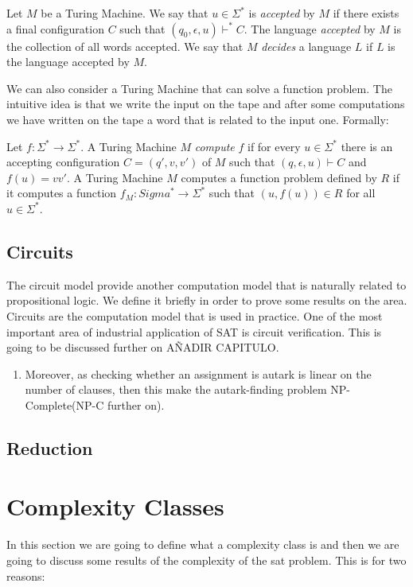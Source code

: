   \begin{definition}
     Let $M$ be a Turing Machine. We say that $u\in\Sigma^*$ is \emph{accepted} by $M$ if there exists a final configuration $C$ such that $(q_0,\epsilon,u)\vdash^* C$. The language \emph{accepted} by $M$ is the collection of all words accepted. We say that $M$ \emph{decides} a language $L$ if $L$ is the language accepted by $M$.
  \end{definition}

  We can also consider a Turing Machine that can solve a function problem. The intuitive idea is that we write the input on the tape and after some computations we have written on the tape a word that is related to the input one. Formally:


  \begin{definition}
    Let $f:\Sigma^*\to \Sigma^*$. A Turing Machine $M$ \emph{compute} $f$ if for every $u\in \Sigma^*$ there is an accepting configuration $C=(q',v,v')$ of $M$  such that $(q,\epsilon,u)\vdash C$ and $f(u)=vv'$. A Turing Machine $M$ computes a function problem defined by $R$ if it computes a function $f_M:Sigma^*\to \Sigma^*$ such that $(u,f(u)) \in R$ for all $ u\in \Sigma^*$.
  \end{definition}

  
\subsection{Circuits}

The circuit model provide another computation model that is naturally related to propositional logic. We define it briefly in order to prove some results on the area. Circuits are the computation model that is used in practice. One of the most important area of industrial application of SAT is circuit verification. This is going to be discussed further on AÑADIR CAPITULO.

\begin{enumerate}
\item Moreover, as checking whether an assignment is autark is linear on the number of clauses, then this make the autark-finding problem NP-Complete(NP-C further on).
\end{enumerate}

\subsection{Reduction}

\section{Complexity Classes}
In this section we are going to define what a complexity class is and then we are going to discuss some results of the complexity of the sat problem. This is for two reasons: 

